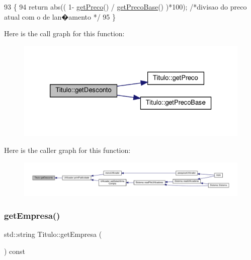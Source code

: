 \begin{DoxyCode}
93  \{
94     \textcolor{keywordflow}{return} abs(( 1- \hyperlink{classTitulo_a93725bdc2e98350e47b54fd76c0fa236}{getPreco}() / \hyperlink{classTitulo_a5257cbaf35ad018001a7e48678795305}{getPrecoBase}() )*100); \textcolor{comment}{/*divisao do preco atual com o
       de lan�amento */}
95  \}
\end{DoxyCode}
Here is the call graph for this function\+:
\nopagebreak
\begin{figure}[H]
\begin{center}
\leavevmode
\includegraphics[width=326pt]{classTitulo_ae7df7d468f8220fa32b2772df4c53081_cgraph}
\end{center}
\end{figure}
Here is the caller graph for this function\+:
\nopagebreak
\begin{figure}[H]
\begin{center}
\leavevmode
\includegraphics[width=350pt]{classTitulo_ae7df7d468f8220fa32b2772df4c53081_icgraph}
\end{center}
\end{figure}
\mbox{\label{classTitulo_a48d810fe27da41cfb726fb5680a68471}} 
\subsubsection{\texorpdfstring{get\+Empresa()}{getEmpresa()}}
{\footnotesize\ttfamily std\+::string Titulo\+::get\+Empresa (\begin{DoxyParamCaption}{ }\end{DoxyParamCaption}) const}



